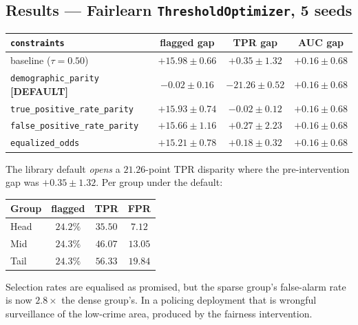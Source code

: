 \documentclass[11pt,a4paper]{article}
\begin{document}
\subsection{Results --- Fairlearn \texttt{ThresholdOptimizer}, 5 seeds}
\begin{center}
\begin{tabular}{lccc}
\toprule
\texttt{constraints} & flagged gap & \textbf{TPR gap} & AUC gap \\
\midrule
baseline ($\tau = 0.50$) & $+15.98\pm0.66$ & $+0.35\pm1.32$ & $+0.16\pm0.68$ \\
\texttt{demographic\_parity} \textbf{[DEFAULT]} & $-0.02\pm0.16$ & $\mathbf{-21.26\pm0.52}$ & $+0.16\pm0.68$ \\
\texttt{true\_positive\_rate\_parity} & $+15.93\pm0.74$ & $-0.02\pm0.12$ & $+0.16\pm0.68$ \\
\texttt{false\_positive\_rate\_parity} & $+15.66\pm1.16$ & $+0.27\pm2.23$ & $+0.16\pm0.68$ \\
\texttt{equalized\_odds} & $+15.21\pm0.78$ & $+0.18\pm0.32$ & $+0.16\pm0.68$ \\
\bottomrule
\end{tabular}
\end{center}

\noindent The library default \emph{opens} a $21.26$-point TPR disparity where
the pre-intervention gap was $+0.35 \pm 1.32$. Per group under the default:
\begin{center}
\begin{tabular}{lccc}
\toprule
Group & flagged & TPR & FPR \\
\midrule
Head & $24.2\%$ & $35.50$ & $7.12$ \\
Mid & $24.3\%$ & $46.07$ & $13.05$ \\
Tail & $24.3\%$ & $56.33$ & $\mathbf{19.84}$ \\
\bottomrule
\end{tabular}
\end{center}
\noindent Selection rates are equalised as promised, but the sparse group's
false-alarm rate is now $2.8\times$ the dense group's. In a policing deployment
that is wrongful surveillance of the low-crime area, produced by the fairness
intervention.
\end{document}
